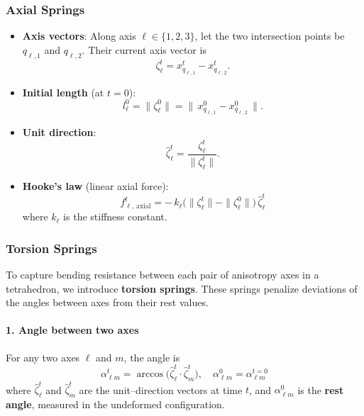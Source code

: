 \documentclass{article}
\begin{document}
\subsubsection{Axial Springs}
\begin{itemize}
    \item \textbf{Axis vectors}: Along axis $\ell\in\{1,2,3\}$, let the two intersection points be $q_{\ell,1}$ and $q_{\ell,2}$. Their current axis vector is
    $$
    \zeta_\ell^t = x^t_{q_{\ell,1}} - x^t_{q_{\ell,2}}.
    $$
    
    \item \textbf{Initial length} (at $t=0$):
    \begin{equation}
    l^0_\ell = \|\zeta_\ell^0\| = \bigl\|\,x^0_{q_{\ell,1}}-x^0_{q_{\ell,2}}\,\bigr\|.
    \tag{2.30}
    \label{eq:initial_length}
    \end{equation}
    
    \item \textbf{Unit direction}:
    \begin{equation}
    \hat\zeta_\ell^t = \frac{\zeta_\ell^t}{\|\zeta_\ell^t\|}.
    \tag{2.31}
    \label{eq:unit_direction}
    \end{equation}
    
    \item \textbf{Hooke’s law} (linear axial force):
    \begin{equation}
    \boxed{
    f^{t}_{\ell,\,\mathrm{axial}} = -\,k_\ell\bigl(\|\zeta_\ell^t\| - \|\zeta_\ell^0\|\bigr)\,\hat\zeta_\ell^t
    }
    \tag{2.35}
    \label{eq:hookes_law}
    \end{equation}
    where $k_\ell$ is the stiffness constant.
\end{itemize}


\subsubsection{Torsion Springs}
To capture bending resistance between each pair of anisotropy axes in a tetrahedron, we introduce \textbf{torsion springs}. These springs penalize deviations of the angles between axes from their rest values.

\paragraph{1. Angle between two axes}
For any two axes $\ell$ and $m$, the angle is
\begin{equation}
\alpha^t_{\ell m} = \arccos\bigl(\hat\zeta_\ell^t \!\cdot\! \hat\zeta_m^t\bigr), \quad \alpha^0_{\ell m} = \alpha_{\ell m}^{t=0}
\tag{2.32}
\label{eq:angle_between_axes}
\end{equation}
where $\hat\zeta_\ell^t$ and $\hat\zeta_m^t$ are the unit–direction vectors at time $t$, and $\alpha^0_{\ell m}$ is the \textbf{rest angle}, measured in the undeformed configuration.
\end{document}

